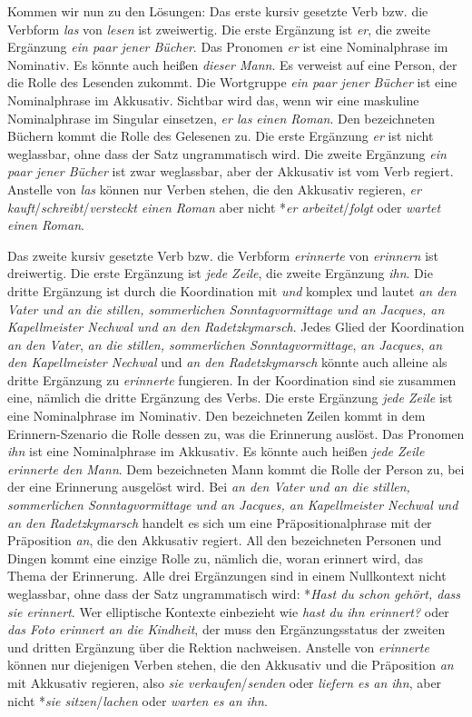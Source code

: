 Kommen wir nun zu den Lösungen: Das erste kursiv gesetzte Verb bzw. die Verbform \textit{las} von \textit{lesen} ist zweiwertig. Die erste Ergänzung ist \textit{er}, die zweite Ergänzung \textit{ein paar jener Bücher}. Das Pronomen \textit{er} ist eine Nominalphrase im Nominativ. Es könnte auch heißen \textit{dieser Mann}. Es verweist auf eine Person, der die Rolle des Lesenden zukommt. Die Wortgruppe \textit{ein paar jener Bücher} ist eine Nominalphrase im Akkusativ. Sichtbar wird das, wenn wir eine maskuline Nominalphrase im Singular einsetzen, \zB \textit{er las einen Roman}. Den bezeichneten Büchern kommt die Rolle des Gelesenen zu. Die erste Ergänzung \textit{er} ist nicht weglassbar, ohne dass der Satz ungrammatisch wird. Die zweite Ergänzung \textit{ein paar jener Bücher} ist zwar weglassbar, aber der Akkusativ ist vom Verb regiert. Anstelle von \textit{las} können nur Verben stehen, die den Akkusativ regieren, \zB \textit{er kauft}/\textit{schreibt}/\textit{versteckt einen Roman} aber nicht *\textit{er arbeitet}/\textit{folgt} oder \textit{wartet einen Roman}.

Das zweite kursiv gesetzte Verb bzw. die Verbform \textit{erinnerte} von \textit{erinnern} ist dreiwertig. Die erste Ergänzung ist \textit{jede Zeile}, die zweite Ergänzung \textit{ihn}. Die dritte Ergänzung ist durch die Koordination mit \textit{und} komplex und lautet \textit{an den Vater und an die stillen, sommerlichen Sonntagvormittage und an Jacques, an Kapellmeister Nechwal und an den Radetzkymarsch}. Jedes Glied der Koordination \textit{an den Vater}, \textit{an die stillen, sommerlichen Sonntagvormittage}, \textit{an Jacques}, \textit{an den Kapellmeister Nechwal} und \textit{an den Radetzkymarsch} könnte auch alleine als dritte Ergänzung zu \textit{erinnerte} fungieren. In der Koordination sind sie zusammen eine, nämlich die dritte Ergänzung des Verbs. Die erste Ergänzung \textit{jede Zeile} ist eine Nominalphrase im Nominativ. Den bezeichneten Zeilen kommt in dem Erinnern-Szenario die Rolle dessen zu, was die Erinnerung auslöst. Das Pronomen \textit{ihn} ist eine Nominalphrase im Akkusativ. Es könnte auch heißen \textit{jede Zeile erinnerte den Mann}. Dem bezeichneten Mann kommt die Rolle der Person zu, bei der eine Erinnerung ausgelöst wird. Bei \textit{an den Vater und an die stillen, sommerlichen Sonntagvormittage und an Jacques, an Kapellmeister Nechwal und an den Radetzkymarsch} handelt es sich um eine Präpositionalphrase mit der Präposition \textit{an}, die den Akkusativ regiert. All den bezeichneten Personen und Dingen kommt eine einzige Rolle zu, nämlich die, woran erinnert wird, das Thema der Erinnerung. Alle drei Ergänzungen sind in einem Nullkontext nicht weglassbar, ohne dass der Satz ungrammatisch wird: *\textit{Hast du schon gehört, dass sie erinnert}. Wer elliptische Kontexte einbezieht wie \textit{hast du ihn erinnert?} oder \textit{das Foto erinnert an die Kindheit}, der muss den Ergänzungsstatus der zweiten und dritten Ergänzung über die Rektion nachweisen. Anstelle von \textit{erinnerte} können nur diejenigen Verben stehen, die den Akkusativ und die Präposition \textit{an} mit Akkusativ regieren, also \zB \textit{sie verkaufen}/\textit{senden} oder \textit{liefern es an ihn}, aber nicht *\textit{sie sitzen}/\textit{lachen} oder \textit{warten es an ihn}. 


